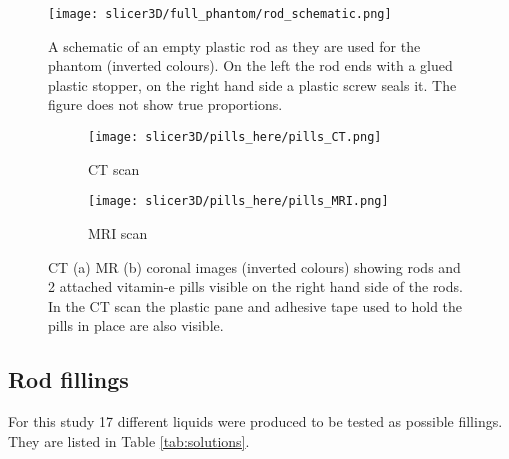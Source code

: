 \begin{figure}[!tbp]
\centering
\texttt{[image: slicer3D/full\_phantom/rod\_schematic.png]}
\caption{A schematic of an empty plastic rod as they are used for the phantom (inverted colours). On the left the rod ends with a glued plastic stopper, on the right hand side a plastic screw seals it. The figure does not show true proportions.}
\label{fig:rod_schematic}
\end{figure}


\begin{figure}[!thb]
\centering
  \begin{subfigure}[b]{0.45\textwidth}
  \centering
    \texttt{[image: slicer3D/pills\_here/pills\_CT.png]}
    \caption{CT scan}
    \label{fig:pills_CT}
  \end{subfigure}
  \begin{subfigure}[b]{0.45\textwidth}
  \centering
      \texttt{[image: slicer3D/pills\_here/pills\_MRI.png]}
    \caption{MRI scan}
    \label{fig:pills_MR}
  \end{subfigure}
  \caption{CT (a) MR (b) coronal images (inverted colours) showing rods and 2 attached vitamin-e pills visible on the right hand side of the rods. In the CT scan the plastic pane and adhesive tape used to hold the pills in place are also visible.}
  \label{fig:pills}
\end{figure}

\clearpage

\subsection{Rod fillings}

For this study 17 different liquids were produced to be tested as possible fillings.
They are listed in Table \ref{tab:solutions}.


